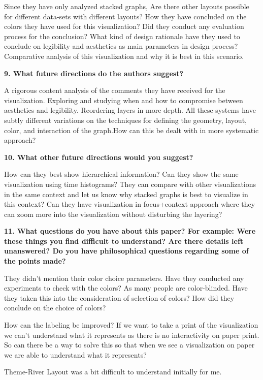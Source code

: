 \documentclass{article}[12pt]
\begin{document}
{
    Since they have only analyzed stacked graphs, Are there other layouts possible for different data-sets with different layouts?
    How they have concluded on the colors they have used for this visualization? 
    Did they conduct any evaluation process for the conclusion?
    What kind of design rationale have they used to conclude on legibility and aesthetics as main parameters in design process?
    Comparative analysis of this visualization and why it is best in this scenario.
    
}

\vspace{2ex}\noindent
{\bf 9. What future directions do the authors suggest?}

{
    A rigorous content analysis of the comments they have received for the visualization.
    Exploring and studying when and how to compromise between aesthetics and legibility.
    Reordering layers in more depth.
    All these systems have subtly different variations on the techniques for defining the geometry, layout, color,
    and interaction of the graph.How can this be dealt with in more systematic approach?
}

\vspace{2ex}\noindent
{\bf 10. What other future directions would you suggest? }

{
   How can they best show hierarchical information?
   Can they show the same visualization using time histograms?
   They can compare with other visualizations in the same context and let us know why stacked graphs is best to visualize in this context?
   Can they have visualization in focus+context approach where they can zoom more into the visualization without disturbing the layering?
}

\vspace{2ex}\noindent
{\bf 11. What questions do you have about this paper? For example: Were these things you find difficult to understand? Are there details left unanswered? Do you have philosophical questions regarding some of the points made?}

{
    They didn't mention their color choice parameters. Have they conducted any experiments to check with the colors? As many people are color-blinded. Have they taken this into the consideration of selection of colors? How did they conclude on the choice of colors? 
    
    How can the labeling be improved? If we want to take a print of the visualization we can't understand what it represents as there is no interactivity on paper print. So can there be a way to solve this so that when we see a visualization on paper we are able to understand what it represents?
    
    Theme-River Layout was a bit difficult to understand initially for me.

}
\end{document}
